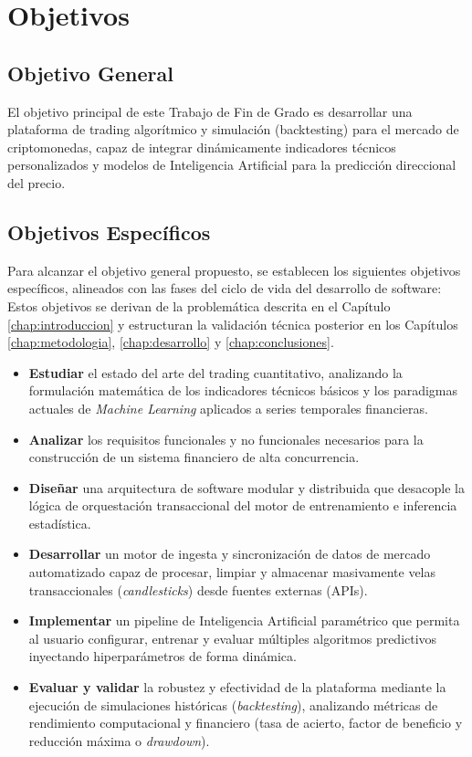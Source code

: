 \chapter{Objetivos}

\label{chap:objetivos}

\section{Objetivo General}
El objetivo principal de este Trabajo de Fin de Grado es desarrollar una plataforma de trading algorítmico y simulación (backtesting) para el mercado de criptomonedas, capaz de integrar dinámicamente indicadores técnicos personalizados y modelos de Inteligencia Artificial para la predicción direccional del precio.

\section{Objetivos Específicos}

Para alcanzar el objetivo general propuesto, se establecen los siguientes objetivos específicos, alineados con las fases del ciclo de vida del desarrollo de software: Estos objetivos se derivan de la problemática descrita en el Capítulo \ref{chap:introduccion} y estructuran la validación técnica posterior en los Capítulos \ref{chap:metodologia}, \ref{chap:desarrollo} y \ref{chap:conclusiones}.

\begin{itemize}
    \item \textbf{Estudiar} el estado del arte del trading cuantitativo, analizando la formulación matemática de los indicadores técnicos básicos y los paradigmas actuales de \textit{Machine Learning} aplicados a series temporales financieras.
    
    \item \textbf{Analizar} los requisitos funcionales y no funcionales necesarios para la construcción de un sistema financiero de alta concurrencia.
    
    \item \textbf{Diseñar} una arquitectura de software modular y distribuida que desacople la lógica de orquestación transaccional del motor de entrenamiento e inferencia estadística.
    
    \item \textbf{Desarrollar} un motor de ingesta y sincronización de datos de mercado automatizado capaz de procesar, limpiar y almacenar masivamente velas transaccionales (\textit{candlesticks}) desde fuentes externas (APIs).
    
    \item \textbf{Implementar} un pipeline de Inteligencia Artificial paramétrico que permita al usuario configurar, entrenar y evaluar múltiples algoritmos predictivos inyectando hiperparámetros de forma dinámica.
    
    \item \textbf{Evaluar y validar} la robustez y efectividad de la plataforma mediante la ejecución de simulaciones históricas (\textit{backtesting}), analizando métricas de rendimiento computacional y financiero (tasa de acierto, factor de beneficio y reducción máxima o \textit{drawdown}).
\end{itemize}
